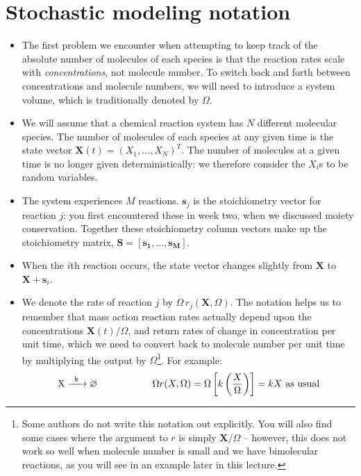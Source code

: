 \documentclass{article}
\begin{document}
\section*{Stochastic modeling notation}
\begin{itemize}
\item The first problem we encounter when attempting to keep track of the absolute number of molecules of each species is that the reaction rates scale with \textit{concentrations}, not molecule number. To switch back and forth between concentrations and molecule numbers, we will need to introduce a system volume, which is traditionally denoted by $\Omega$.
\item We will assume that a chemical reaction system has $N$ different molecular species. The number of molecules of each species at any given time is the state vector $\mathbf{X}(t) = (X_1, \ldots, X_N)^T$. The number of molecules at a given time is no longer given deterministically: we therefore consider the $X_i$s to be random variables.
\item The system experiences $M$ reactions. $\mathbf{s}_j$ is the stoichiometry vector for reaction $j$: you first encountered these in week two, when we discussed moiety conservation. Together these stoichiometry column vectors make up the stoichiometry matrix, $\mathbf{S} = [\mathbf{s_1}, \ldots,  \mathbf{s_M}]$.
\item When the $i$th reaction occurs, the state vector changes slightly from $\mathbf{X}$ to $\mathbf{X} + \mathbf{s}_i$.
\item We denote the rate of reaction $j$ by $ \Omega\, r_j(\mathbf{X},\Omega)$. The notation helps us to remember that mass action reaction rates actually depend upon the concentrations $\mathbf{X}(t)/\Omega$, and return rates of change in concentration per unit time, which we need to convert back to molecule number per unit time by multiplying the output by $\Omega$\footnote{Some authors do not write this notation out explicitly. You will also find some cases where the argument to $r$ is simply $\mathbf{X}/\Omega$ -- however, this does not work so well when molecule number is small and we have bimolecular reactions, as you will see in an example later in this lecture.}. For example:
\[ \ce{X ->[k] \varnothing} \hspace{2 cm} \Omega r(X, \Omega) = \Omega \left[ k \left( \frac{X}{\Omega} \right) \right] = kX \textrm{ as usual} \]
\end{itemize}
\end{document}
